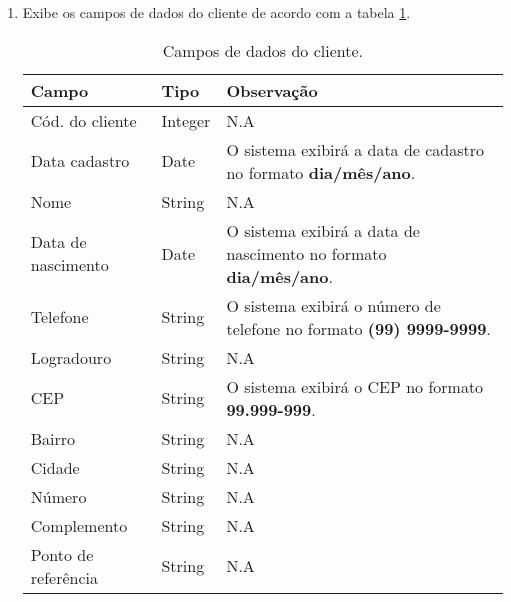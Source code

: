 \begin{enumerate}[label=RN\arabic*]
	\item Exibe os campos de dados do cliente de acordo com a tabela \ref{uc013_tb_rn1}. \label{uc013_rn:1}
	\begin{table}[htb]
		\ABNTEXfontereduzida
		\caption[Campos de dados do cliente]{Campos de dados do cliente.}
		\label{uc013_tb_rn1}
		\begin{tabular}{|p{4.0cm}|p{3.0cm}|p{7.25cm}|}
			\hline
			\textbf{Campo}      & \textbf{Tipo} & \textbf{Observação}                                                        \\ \hline
			Cód. do cliente     & Integer       & N.A                                                                        \\ \hline
			Data cadastro       & Date          & O sistema exibirá a data de cadastro no formato \textbf{dia/mês/ano}.      \\ \hline
			Nome                & String        & N.A                                                                        \\ \hline
			Data de nascimento  & Date          & O sistema exibirá a data de nascimento no formato \textbf{dia/mês/ano}.    \\ \hline
			Telefone            & String        & O sistema exibirá o número de telefone no formato \textbf{(99) 9999-9999}. \\ \hline
			Logradouro          & String        & N.A                                                                        \\ \hline
			CEP                 & String        & O sistema exibirá o CEP no formato \textbf{99.999-999}.                    \\ \hline
			Bairro              & String        & N.A                                                                        \\ \hline
			Cidade              & String        & N.A                                                                        \\ \hline
			Número              & String        & N.A                                                                        \\ \hline
			Complemento         & String        & N.A                                                                        \\ \hline
			Ponto de referência & String        & N.A                                                                        \\ \hline
		\end{tabular}
	\end{table}
	

\end{enumerate}
